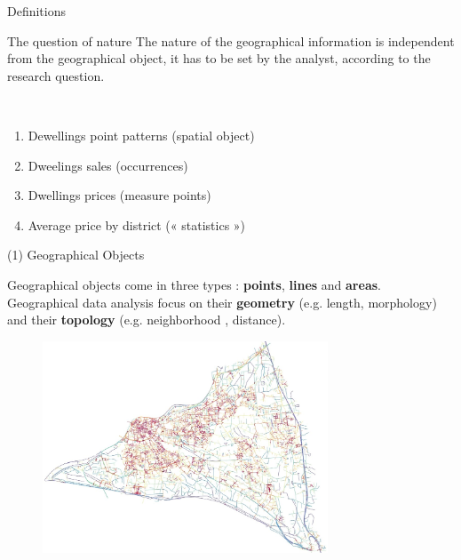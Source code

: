 \begin{frame}{Definitions}

\begin{block}{The question of nature}
The nature of the geographical information is independent from the geographical object, 
 it has to be set by the analyst, according to the research question.
\end{block}

~

\begin{enumerate}
\item Dewellings point patterns (spatial object)
\item Dweelings sales (occurrences)
\item Dwellings prices (measure points)
\item Average price by district (« statistics »)
\end{enumerate}

\end{frame}



\begin{frame}{(1) Geographical Objects }

 Geographical objects come in three types : \textbf{points}, \textbf{lines} and \textbf{areas}. Geographical data analysis focus on their \textbf{geometry} (e.g. length, morphology) and their \textbf{topology} (e.g. neighborhood , distance).

\begin{figure}
  \includegraphics[width=8.5cm]{Morpheo.jpg}
\end{figure}

\end{frame}


